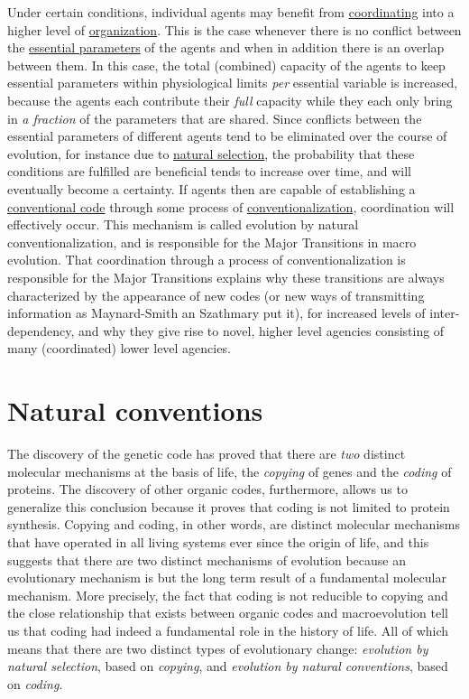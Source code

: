 \documentclass[12pt]{article}
\begin{document}
Under certain conditions, individual agents may benefit from
\hyperlink{coordination}{coordinating} into a higher level of
\hyperlink{organization}{organization}.  This is the case whenever
there is no conflict between the
\hyperlink{essential_parameters}{essential parameters} of the agents
and when in addition there is an overlap between them. In this case,
the total (combined) capacity of the agents to keep essential
parameters within physiological limits {\em per} essential variable is
increased, because the agents each contribute their {\em full}
capacity while they each only bring in {\em a fraction} of the
parameters that are shared. Since conflicts between the essential
parameters of different agents tend to be eliminated over the course
of evolution, for instance due to
\hyperlink{natural_selection}{natural selection}, the probability that
these conditions are fulfilled are beneficial tends to increase over
time, and will eventually become a certainty. If agents then are
capable of establishing a \hyperlink{convention}{conventional code}
through some process of
\hyperlink{conventionalization}{conventionalization}, coordination
will effectively occur.  This mechanism is called evolution by natural
conventionalization, and is responsible for the Major Transitions in
macro evolution. That coordination through a process of
conventionalization is responsible for the Major Transitions explains
why these transitions are always characterized by the appearance of
new codes (or new ways of transmitting information as Maynard-Smith an
Szathmary put it), for increased levels of inter-dependency, and why
they give rise to novel, higher level agencies consisting of many
(coordinated) lower level agencies.

\section{Natural conventions}
The discovery of the genetic code has proved that there are \textit{two} distinct molecular mechanisms at the basis of life, the \textit{copying} of genes and the \textit{coding} of proteins. The discovery of other organic codes, furthermore, allows us to generalize this conclusion because it proves that coding is not limited to protein synthesis. Copying and coding, in other words, are distinct molecular mechanisms that have operated in all living systems ever since the origin of life, and this suggests that there are two distinct mechanisms of evolution because an evolutionary mechanism is but the long term result of a fundamental molecular mechanism. More precisely, the fact that coding is not reducible to copying and the close relationship that exists between organic codes and macroevolution tell us that coding had indeed a fundamental role in the history of life. All of which means that there are two distinct types of evolutionary change: \textit{evolution by natural selection}, based on \textit{copying}, and \textit{evolution by natural conventions}, based on \textit{coding}.
 
\end{document}

